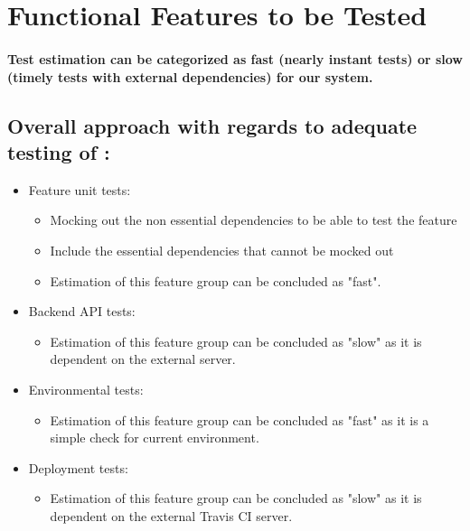 \documentclass{article}
\begin{document}
\pagebreak
\section{Functional Features to be Tested}\label{sec:FeaturesTest}
\paragraph{Test estimation can be categorized as fast (nearly instant tests) or slow (timely tests with external dependencies) for our system.} 
\subsection{Overall approach with regards to adequate testing of :} 
\begin{itemize}
\item Feature unit tests:
\begin{itemize}
	\item Mocking out the non essential dependencies to be able to test the feature
	\item Include the essential dependencies that cannot be mocked out
	\item Estimation of this feature group can be concluded as "fast".
\end{itemize}
\item Backend API tests:
\begin{itemize}
	\item Estimation of this feature group can be concluded as "slow" as it is dependent on the external server.
\end{itemize}
\item Environmental tests:
\begin{itemize}
	\item Estimation of this feature group can be concluded as "fast" as it is a simple check for current environment.
\end{itemize}
\item Deployment tests:
\begin{itemize}
	\item Estimation of this feature group can be concluded as "slow" as it is dependent on the external Travis CI server.
\end{itemize}
\end{itemize}
\end{document}
